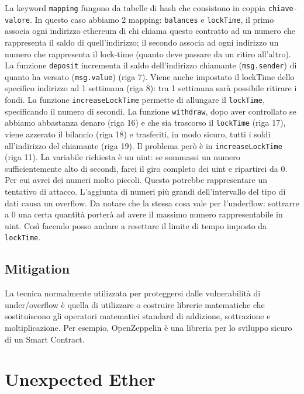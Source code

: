 La keyword \verb|mapping| fungono da tabelle di hash che consistono in coppia
\verb|chiave-valore|. In questo caso abbiamo 2 mapping: \verb|balances| e \verb|lockTime|,
il primo associa ogni indirizzo ethereum di chi chiama questo contratto ad un numero
che rappresenta il saldo di quell'indirizzo; il secondo associa ad ogni indirizzo
un numero che rappresenta il lock-time (quanto deve passare da un ritiro all'altro).
La funzione \verb|deposit| incrementa il saldo dell'indirizzo chiamante (\verb|msg.sender|)
di quanto ha versato (\verb|msg.value|) (riga 7). Viene anche impostato il lockTime
dello specifico indirizzo ad 1 settimana (riga 8): tra 1 settimana sarà possibile ritirare i fondi.
La funzione \verb|increaseLockTime| permette di allungare il \verb|lockTime|, specificando
il numero di secondi.
La funzione \verb|withdraw|, dopo aver controllato se abbiamo abbastanza denaro
(riga 16) e che sia trascorso il \verb|lockTime| (riga 17), viene azzerato
il bilancio (riga 18)
e trasferiti, in modo sicuro, tutti i soldi all'indirizzo del chiamante (riga 19).
Il problema però è in \verb|increaseLockTime| (riga 11).
La variabile richiesta è un uint: se sommassi un
numero sufficientemente alto di secondi, farei il giro completo dei uint e
ripartirei da 0.
Per cui avrei dei numeri molto piccoli.
Questo potrebbe rappresentare un tentativo di attacco.
L'aggiunta di numeri più grandi dell'intervallo del tipo di dati causa un overflow.
Da notare che la stessa cosa vale per l'underflow: sottrarre a $0$ una certa
quantità porterà ad avere il massimo numero rappresentabile in uint.
Così facendo posso andare a resettare il limite di tempo imposto da \verb|lockTime|.

\subsection{Mitigation}

La tecnica normalmente utilizzata per proteggersi dalle vulnerabilità di
under/overflow è
quella di utilizzare o costruire librerie matematiche che sostituiscono gli
operatori matematici
standard di addizione, sottrazione e moltiplicazione.
Per esempio, OpenZeppelin è una
libreria per lo sviluppo sicuro di un Smart Contract.

\section{Unexpected Ether}

